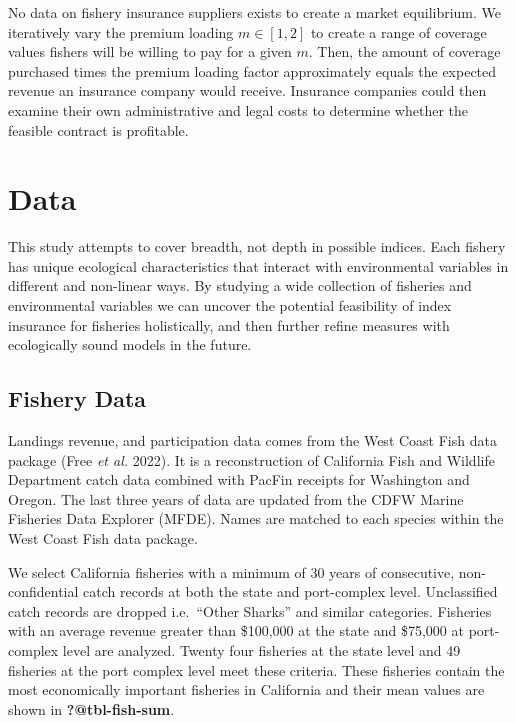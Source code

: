 \documentclass[
  letterpaper,
  DIV=11,
  numbers=noendperiod]{scrartcl}
\begin{document}
No data on fishery insurance suppliers exists to create a market
equilibrium. We iteratively vary the premium loading \(m\in[1,2]\) to
create a range of coverage values fishers will be willing to pay for a
given \(m\). Then, the amount of coverage purchased times the premium
loading factor approximately equals the expected revenue an insurance
company would receive. Insurance companies could then examine their own
administrative and legal costs to determine whether the feasible
contract is profitable.

\hypertarget{sec-data}{%
\section{Data}\label{sec-data}}

This study attempts to cover breadth, not depth in possible indices.
Each fishery has unique ecological characteristics that interact with
environmental variables in different and non-linear ways. By studying a
wide collection of fisheries and environmental variables we can uncover
the potential feasibility of index insurance for fisheries holistically,
and then further refine measures with ecologically sound models in the
future.

\hypertarget{fishery-data}{%
\subsection{Fishery Data}\label{fishery-data}}

Landings revenue, and participation data comes from the West Coast Fish
data package (Free \emph{et al.} 2022). It is a reconstruction of
California Fish and Wildlife Department catch data combined with PacFin
receipts for Washington and Oregon. The last three years of data are
updated from the CDFW Marine Fisheries Data Explorer (MFDE). Names are
matched to each species within the West Coast Fish data package.

We select California fisheries with a minimum of 30 years of
consecutive, non-confidential catch records at both the state and
port-complex level. Unclassified catch records are dropped i.e.~``Other
Sharks'' and similar categories. Fisheries with an average revenue
greater than \$100,000 at the state and \$75,000 at port-complex level
are analyzed. Twenty four fisheries at the state level and 49 fisheries
at the port complex level meet these criteria. These fisheries contain
the most economically important fisheries in California and their mean
values are shown in \textbf{?@tbl-fish-sum}.
\end{document}
